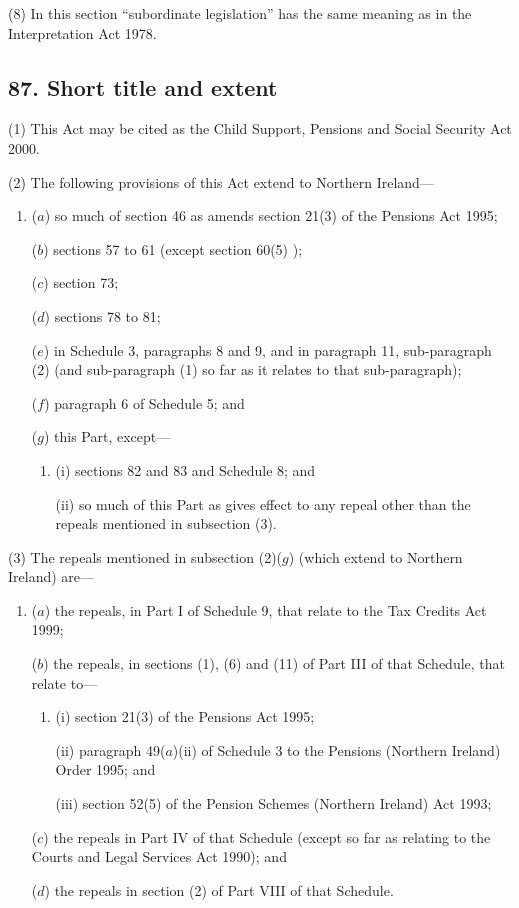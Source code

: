 \documentclass[12pt,a4paper]{article}
\begin{document}
(8) In this section “subordinate legislation” has the same meaning as in the  Interpretation Act 1978. 

\subsection{87. Short title and extent}

(1) This Act may be cited as the Child Support, Pensions and Social Security Act 2000. 

(2) The following provisions of this Act extend to Northern Ireland—
\begin{enumerate}\item[]
($a$) so much of section 46 as amends section 21(3)  of the Pensions Act 1995;

($b$) sections 57 to 61 (except section 60(5) );

($c$) section 73;

($d$) sections 78 to 81;

($e$) in Schedule 3, paragraphs 8 and 9, and in paragraph 11, sub-paragraph (2)  (and sub-paragraph (1)  so far as it relates to that sub-paragraph);

($f$) paragraph 6 of Schedule 5; and

($g$) this Part, except—
\begin{enumerate}\item[]
(i) sections 82 and 83 and Schedule 8; and

(ii) so much of this Part as gives effect to any repeal other than the repeals mentioned in subsection (3).
\end{enumerate}
\end{enumerate}

(3) The repeals mentioned in subsection (2)($g$)  (which extend to Northern Ireland) are—
\begin{enumerate}\item[]
($a$) the repeals, in Part I of Schedule 9, that relate to the Tax Credits Act 1999;

($b$) the repeals, in sections (1), (6)  and (11)  of Part III of that Schedule, that relate to—
\begin{enumerate}\item[]
(i) section 21(3)  of the Pensions Act 1995;

(ii) paragraph 49($a$)(ii)  of Schedule 3 to the Pensions (Northern Ireland) Order 1995; and

(iii) section 52(5)  of the Pension Schemes (Northern Ireland) Act 1993;
\end{enumerate}

($c$) the repeals in Part IV of that Schedule (except so far as relating to the Courts and Legal Services Act 1990); and

($d$) the repeals in section (2)  of Part VIII of that Schedule.
\end{enumerate}
\end{document}
